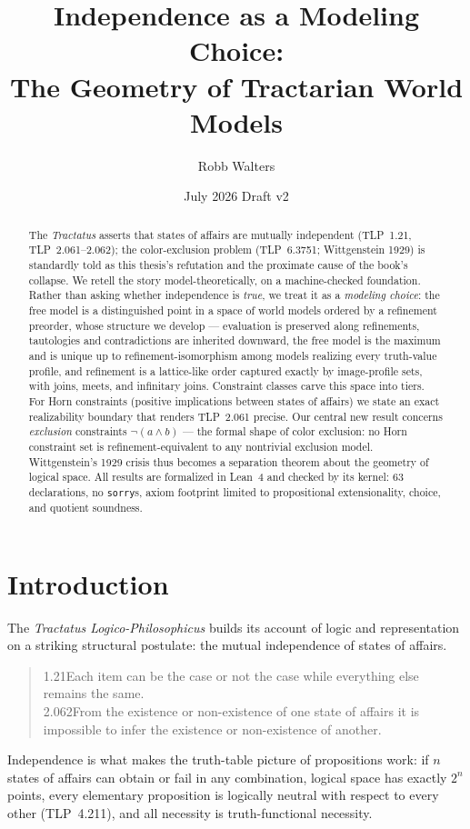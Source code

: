 \documentclass[10pt, letterpaper]{article}
\title{Independence as a Modeling Choice:\\
  The Geometry of Tractarian World Models}
\author{Robb Walters}
\date{July 2026 \quad\textbar\quad Draft v2}
\theoremstyle{remark}
\newcommand{\lean}[1]{\texttt{#1}}
\newcommand{\TLP}[1]{TLP~#1}
\begin{document}
\maketitle

\begin{abstract}
The \emph{Tractatus} asserts that states of affairs are mutually independent
(\TLP{1.21}, \TLP{2.061--2.062}); the color-exclusion problem (\TLP{6.3751};
Wittgenstein 1929) is standardly told as this thesis's refutation and the
proximate cause of the book's collapse. We retell the story
model-theoretically, on a machine-checked foundation. Rather than asking
whether independence is \emph{true}, we treat it as a \emph{modeling choice}:
the free model is a distinguished point in a space of world models ordered by
a refinement preorder, whose structure we develop --- evaluation is preserved
along refinements, tautologies and contradictions are inherited downward, the
free model is the maximum and is unique up to refinement-isomorphism among
models realizing every truth-value profile, and refinement is a lattice-like
order captured exactly by image-profile sets, with joins, meets, and
infinitary joins. Constraint classes carve this space into tiers. For Horn
constraints (positive implications between states of affairs) we state an
exact realizability boundary that renders \TLP{2.061} precise. Our central
new result concerns \emph{exclusion} constraints
$\neg(a \wedge b)$ --- the formal shape of color exclusion: no Horn constraint
set is refinement-equivalent to any nontrivial exclusion model. Wittgenstein's
1929 crisis thus becomes a separation theorem about the geometry of logical
space. All results are formalized in Lean~4 and checked by its kernel: 63
declarations, no \lean{sorry}s, axiom footprint limited to propositional
extensionality, choice, and quotient soundness.
\end{abstract}

\section{Introduction}\label{sec:intro}

The \emph{Tractatus Logico-Philosophicus} builds its account of logic and
representation on a striking structural postulate: the mutual independence of
states of affairs.
\begin{quote}
  1.21\quad Each item can be the case or not the case while everything else
  remains the same.\\[2pt]
  2.062\quad From the existence or non-existence of one state of affairs it is
  impossible to infer the existence or non-existence of another.
  \cite{wittgenstein1921}
\end{quote}
Independence is what makes the truth-table picture of propositions work:
if $n$ states of affairs can obtain or fail in any combination, logical space
has exactly $2^n$ points, every elementary proposition is logically neutral
with respect to every other (\TLP{4.211}), and all necessity is truth-functional
necessity.
\end{document}
